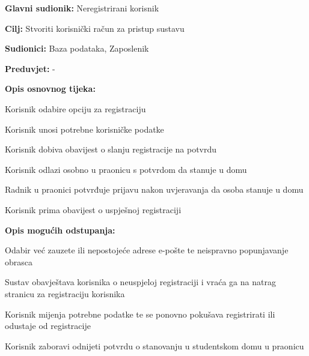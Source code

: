 \noindent {}
\begin{packed_item}
	
	\item \textbf{Glavni sudionik: } Neregistrirani korisnik
	\item  \textbf{Cilj:} Stvoriti korisnički račun za pristup sustavu
	\item  \textbf{Sudionici:}  Baza podataka, Zaposlenik
	\item  \textbf{Preduvjet:} -
	\item  \textbf{Opis osnovnog tijeka:}
	
	\item[] \begin{packed_enum}
		
		\item Korisnik odabire opciju za registraciju
		\item Korisnik unosi potrebne korisničke podatke
		\item Korisnik dobiva obavijest o slanju registracije na potvrdu
		\item Korisnik odlazi osobno u praonicu s potvrdom da stanuje u domu 
		\item Radnik u praonici potvrđuje prijavu nakon uvjeravanja da osoba stanuje u domu
		\item Korisnik prima obavijest o uspješnoj registraciji
	\end{packed_enum}
	
	\item  \textbf{Opis mogućih odstupanja:}
	
	\item[] \begin{packed_item}
		
		\item[2.a] Odabir već zauzete ili nepostojeće adrese e-pošte te neispravno popunjavanje obrasca
		\item[] \begin{packed_enum}
			
			\item Sustav obavještava korisnika o neuspjeloj registraciji i vraća ga na natrag stranicu za registraciju korisnika
			\item Korisnik mijenja potrebne podatke te se ponovno pokušava registrirati ili odustaje od registracije
			
		\end{packed_enum}
		
		\item[4.a] Korisnik zaboravi odnijeti potvrdu o stanovanju u studentskom domu u praonicu
		\item[] \begin{packed_enum}
			

\end{packed_enum}
\end{packed_item}
\end{packed_item}
